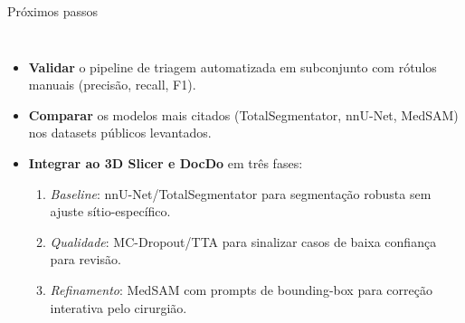 \documentclass[aspectratio=169]{beamer}
\begin{document}
\begin{frame}{Próximos passos}
\small
\begin{columns}[c]
\begin{itemize}
  \item \textbf{Validar} o pipeline de triagem automatizada em subconjunto com rótulos manuais (precisão, recall, F1).
  \item \textbf{Comparar} os modelos mais citados (TotalSegmentator, nnU-Net, MedSAM) nos datasets públicos levantados.
  \item \textbf{Integrar ao 3D Slicer e DocDo} em três fases:
  \begin{enumerate}\scriptsize
    \item \textit{Baseline}: nnU-Net/TotalSegmentator para segmentação robusta sem ajuste sítio-específico.
    \item \textit{Qualidade}: MC-Dropout/TTA para sinalizar casos de baixa confiança para revisão.
    \item \textit{Refinamento}: MedSAM com prompts de bounding-box para correção interativa pelo cirurgião.
  \end{enumerate}
\end{itemize}
\centering
{}
\end{columns}
\end{frame}
\end{document}
